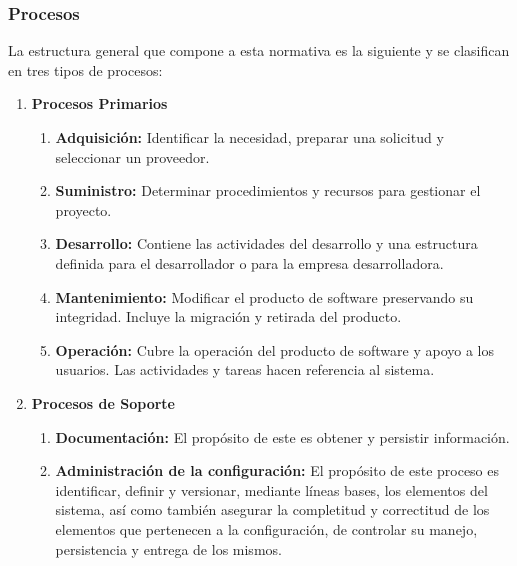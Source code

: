 \documentclass{article}
\begin{document}
\subsubsection{Procesos}
La estructura general que compone a esta normativa es la siguiente y se
clasifican en tres tipos de procesos:
\begin{enumerate}
    \item \textbf{Procesos Primarios}
            \begin{enumerate}
                \item \textbf{Adquisición: }Identificar la
                necesidad, preparar una solicitud y seleccionar un proveedor.

                \item \textbf{Suministro: }Determinar
                procedimientos y recursos para gestionar el proyecto.

                \item \textbf{Desarrollo: }Contiene las
                actividades del desarrollo y una estructura definida para el
                desarrollador o para la empresa desarrolladora.

                \item \textbf{Mantenimiento: }Modificar el
                producto de software preservando su integridad. Incluye la
                migración y retirada del producto.

                \item \textbf{Operación: }Cubre la operación del
                producto de software y apoyo a los usuarios. Las actividades y
                tareas hacen referencia al sistema.
            \end{enumerate}

    \item \textbf{Procesos de Soporte}
    \begin{enumerate}
        \item \textbf{Documentación: }El propósito de este es obtener y
        persistir información.

        \item \textbf{Administración de la configuración: }El propósito
        de este proceso es identificar, definir y versionar, mediante líneas
        bases, los elementos del sistema, así como también asegurar la
        completitud y correctitud de los elementos que pertenecen a la
        configuración, de controlar su manejo, persistencia y entrega de los
        mismos.


\end{enumerate}
\end{enumerate}
\end{document}

